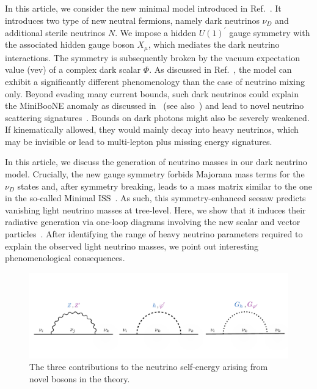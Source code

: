 In this article, we consider the new minimal model introduced in Ref.~\cite{Ballett:2019pyw}.
It introduces two type of new neutral fermions, namely dark neutrinos $\nu_D$ and additional sterile neutrinos $N$. We impose a hidden $U(1)^\prime$ gauge symmetry with the associated hidden gauge boson $X_\mu$, which mediates the dark neutrino interactions. The symmetry is subsequently broken by the vacuum expectation value (vev) of a complex dark scalar $\Phi$. As discussed in Ref.~\cite{Ballett:2019pyw}, the model can exhibit a significantly different phenomenology than the case of neutrino mixing only. Beyond evading many current bounds, such dark neutrinos could explain the MiniBooNE anomaly as discussed in~\cite{Ballett:2018ynz} (see also~\cite{Bertuzzo:2018itn}) and lead to novel neutrino scattering signatures~\cite{Arguelles:2018mtc}. Bounds on dark photons might also be severely weakened. If kinematically allowed, they would mainly decay into heavy neutrinos, which may be invisible or lead to multi-lepton plus missing energy signatures. 

In this article, we discuss the generation of neutrino masses in our dark neutrino model.
Crucially, the new gauge symmetry forbids Majorana mass terms for the $\nu_D$ states and, after symmetry breaking, leads to a mass matrix similar to the one in the so-called Minimal ISS~\cite{Dev:2012sg}. As such, this symmetry-enhanced seesaw predicts vanishing light neutrino masses at tree-level. Here, we show that it induces their radiative generation via one-loop diagrams involving the new scalar and vector particles~\cite{Dev:2012sg,Zhang:2013ama,Diaz:2017edh}. After identifying the range of heavy neutrino parameters required to explain the observed light neutrino masses, we point out interesting phenomenological consequences.

\begin{figure}[t]
\centering\includegraphics[width=\textwidth]{Loop_masses.pdf}
\caption[]{\label{fig:loops}The three contributions to the neutrino self-energy arising from novel bosons in the theory.}
\end{figure}

